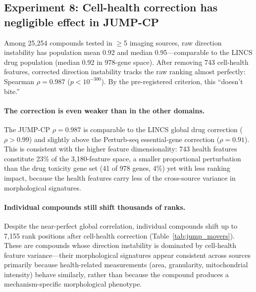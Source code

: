 \documentclass{article}
\begin{document}
\subsection{Experiment 8: Cell-health correction has negligible effect in JUMP-CP}

Among 25{,}254 compounds tested in $\geq$5 imaging sources, raw direction
instability has population mean 0.92 and median 0.95---comparable to the
LINCS drug population (median 0.92 in 978-gene space). After removing 743
cell-health features, corrected direction instability tracks the raw ranking
almost perfectly: Spearman $\rho = 0.987$ ($p < 10^{-300}$). By the
pre-registered criterion, this ``doesn't bite.''

\paragraph{The correction is even weaker than in the other domains.}
The JUMP-CP $\rho = 0.987$ is comparable to the LINCS global drug
correction ($\rho > 0.99$) and slightly above the Perturb-seq
essential-gene correction ($\rho = 0.91$). This
is consistent with the higher feature dimensionality: 743 health features
constitute 23\% of the 3{,}180-feature space, a smaller proportional
perturbation than the drug toxicity gene set (41 of 978 genes, 4\%) yet
with less ranking impact, because the health features carry less of the
cross-source variance in morphological signatures.

\paragraph{Individual compounds still shift thousands of ranks.}
Despite the near-perfect global correlation, individual compounds shift up
to 7{,}155 rank positions after cell-health correction
(Table~\ref{tab:jump_movers}). These are compounds whose direction
instability is dominated by cell-health feature variance---their
morphological signatures appear consistent across sources primarily because
health-related measurements (area, granularity, mitochondrial intensity)
behave similarly, rather than because the compound produces a
mechanism-specific morphological phenotype.
\end{document}
